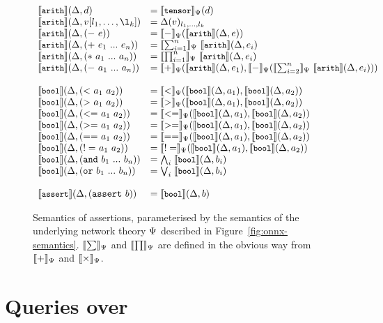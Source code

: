 \begin{figure}
\newcommand{\semComp}[1]{\semBool{(\mathtt{#1}~a_1~a_2)}
    &= \sem{#1}_\networkTheoryVar(\semBool{a_1},\semBool{a_2})}
 
\begin{equation*}
\begin{array}{llll}
    \semArith{d}
    &= \semTensor_\networkTheoryVar(d)
    \\
    \semArith{v[l_1, \ldots, \l_k]} 
    &= \assertEnv(v)_{l_1, \ldots, l_k} 
    \\
    \semArith{({\mathtt{-}}~e)}
    &= \sem{-}_\networkTheoryVar(\semArith{e}) 
    \\
    \semArith{(\mathtt{+}~e_1~...~e_n)} 
    &= \sem{\sum^n_{i=1}}_\networkTheoryVar~\semArith{e_i}
    \\
    \semArith{(\mathtt{*}~a_1~...~a_n)} 
    &= \sem{\prod^n_{i=1}}_\networkTheoryVar~\semArith{e_i}
    \\
    \semArith{(\mathtt{-}~a_1~...~a_n)} 
    &= \sem{+}_\networkTheoryVar(\semArith{e_1}, \sem{-}_\networkTheoryVar(\sem{\sum^n_{i=2}}_\networkTheoryVar~\semArith{e_i}))
    \\
    \\
    \semComp{<}
    \\
    \semComp{>}
    \\
    \semComp{<=}
    \\
    \semComp{>=}
    \\
    \semComp{==}
    \\
    \semComp{!=}
    \\
    \semBool{(\mathtt{and}~b_1~...~b_n)} &=\bigwedge_{i} \;\semBool{b_i}\\
    \semBool{(\mathtt{or}~b_1~...~b_n)} &=\bigvee_{i} \; \semBool{b_i}
    \\
    \\
    \semAssert{(\mathtt{assert}~b)} &= \semBool{b}
\end{array}
\end{equation*}
\caption{Semantics of \vnnlib{} assertions, parameterised by the semantics of the underlying network theory $\Psi$ described in Figure~\ref{fig:onnx-semantics}. $\llbracket \sum \rrbracket_\Psi$ and $\llbracket \prod \rrbracket_\Psi$ are defined in the obvious way from $\llbracket + \rrbracket_\Psi$ and $\llbracket \times \rrbracket_\Psi$. }
\label{fig:sem-assertions}
\end{figure}

 

\section{Queries over \real}
\label{sec:real-queries}

